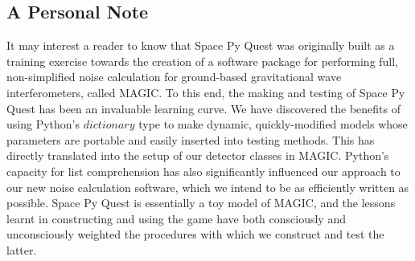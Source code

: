 \documentclass{article}
\begin{document}
\subsection{A Personal Note}
It may interest a reader to know that Space Py Quest was originally
built as a training exercise towards the creation of a software
package for performing full, non-simplified noise calculation for
ground-based gravitational wave interferometers, called MAGIC. To this
end, the making and testing of Space Py Quest has been an invaluable
learning curve. We have discovered the benefits of using Python's
$dictionary$ type to make dynamic, quickly-modified models whose
parameters are portable and easily inserted into testing methods. This
has directly translated into the setup of our detector classes in
MAGIC. Python's capacity for list comprehension has also significantly
influenced our approach to our new noise calculation software, which
we intend to be as efficiently written as possible. Space Py Quest is
essentially a toy model of MAGIC, and the lessons learnt in
constructing and using the game have both consciously and
unconsciously weighted the procedures with which we construct and test
the latter.
\end{document}
